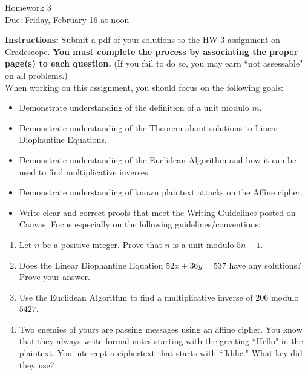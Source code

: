 \documentclass[12pt]{article}
\begin{document}
\begin{center}
{\Large Homework 3}\\
Due: Friday,  February 16 at noon\\


\end{center}
{\bf Instructions:} Submit a pdf of your solutions to the HW 3 assignment on Gradescope.  {\bf You must complete the process by associating the proper page(s) to each question.} (If you fail to do so, you may earn ``not assessable" on all problems.)\\[3pt]

\noindent When working on this assignment, you should focus on the following goals:
\begin{itemize}
\item Demonstrate understanding of the definition of a unit modulo $m$.  
\item Demonstrate understanding of the Theorem about solutions to Linear Diophantine Equations.
\item Demonstrate understanding of the Euclidean Algorithm and how it can be used to find multiplicative inverses.
\item Demonstrate understanding of known plaintext attacks on the Affine cipher. 
\item Write clear and correct proofs that meet the Writing Guidelines posted on Canvas. Focus especially on the following guidelines/conventions:
\end{itemize}

\begin{enumerate}

\item Let $n$ be a positive integer. Prove that $n$ is a unit modulo $5n-1$. 
\item Does the Linear Diophantine Equation $52x+36y=537$ have any solutions? Prove your answer.

\item Use the Euclidean Algorithm to find a multiplicative inverse of $206$ modulo $5427$. 

\item Two enemies of yours are passing messages using an affine cipher. You know that they always write formal notes starting with the greeting ``Hello" in the plaintext.  You intercept a ciphertext that starts with ``fkhhc." What key did they use?


\end{enumerate}
\end{document}
